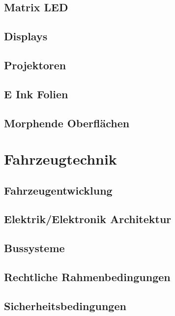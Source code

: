 \subsection{Matrix LED}
\subsection{Displays}
\subsection{Projektoren}
\subsection{E Ink Folien}
\subsection{Morphende Oberflächen}
\section{Fahrzeugtechnik}
\subsection{Fahrzeugentwicklung}
\subsection{Elektrik/Elektronik Architektur}
\subsection{Bussysteme}
\subsection{Rechtliche Rahmenbedingungen}
\subsection{Sicherheitsbedingungen}

